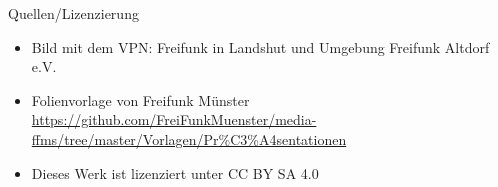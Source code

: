 \documentclass{beamer}
\begin{document}
\begin{frame} {Quellen/Lizenzierung}
\begin{itemize}
\item Bild mit dem VPN: Freifunk in Landshut und Umgebung Freifunk Altdorf e.V.
\item Folienvorlage von Freifunk Münster
 \url{https://github.com/FreiFunkMuenster/media-ffms/tree/master/Vorlagen/Pr\%C3\%A4sentationen}
\item Dieses Werk ist lizenziert unter CC BY SA 4.0
\end{itemize}
\end{frame}
\end{document}
